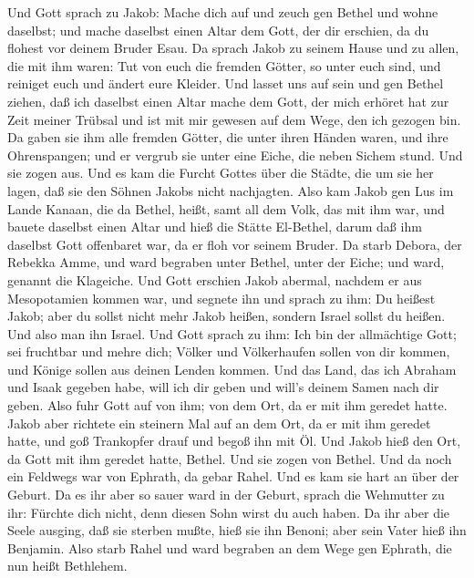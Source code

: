  Und Gott sprach zu Jakob: Mache dich auf und zeuch gen
Bethel und wohne daselbst; und mache daselbst einen Altar dem Gott, der
dir erschien, da du flohest vor deinem Bruder Esau.  Da
sprach Jakob zu seinem Hause und zu allen, die mit ihm waren: Tut von
euch die fremden Götter, so unter euch sind, und reiniget euch und
ändert eure Kleider.  Und lasset uns auf sein und gen Bethel
ziehen, daß ich daselbst einen Altar mache dem Gott, der mich erhöret
hat zur Zeit meiner Trübsal und ist mit mir gewesen auf dem Wege, den
ich gezogen bin.  Da gaben sie ihm alle fremden Götter, die
unter ihren Händen waren, und ihre Ohrenspangen; und er vergrub sie
unter eine Eiche, die neben Sichem stund.  Und sie zogen
aus. Und es kam die Furcht Gottes über die Städte, die um sie her lagen,
daß sie den Söhnen Jakobs nicht nachjagten.  Also kam Jakob
gen Lus im Lande Kanaan, die da Bethel, heißt, samt all dem Volk, das
mit ihm war,  und bauete daselbst einen Altar und hieß die
Stätte El-Bethel, darum daß ihm daselbst Gott offenbaret war, da er floh
vor seinem Bruder.  Da starb Debora, der Rebekka Amme, und
ward begraben unter Bethel, unter der Eiche; und ward, genannt die
Klageiche.  Und Gott erschien Jakob abermal, nachdem er aus
Mesopotamien kommen war, und segnete ihn  und sprach zu
ihm: Du heißest Jakob; aber du sollst nicht mehr Jakob heißen, sondern
Israel sollst du heißen. Und also man ihn Israel.  Und Gott
sprach zu ihm: Ich bin der allmächtige Gott; sei fruchtbar und mehre
dich; Völker und Völkerhaufen sollen von dir kommen, und Könige sollen
aus deinen Lenden kommen.  Und das Land, das ich Abraham
und Isaak gegeben habe, will ich dir geben und will's deinem Samen nach
dir geben.  Also fuhr Gott auf von ihm; von dem Ort, da er
mit ihm geredet hatte.  Jakob aber richtete ein steinern
Mal auf an dem Ort, da er mit ihm geredet hatte, und goß Trankopfer
drauf und begoß ihn mit Öl.  Und Jakob hieß den Ort, da
Gott mit ihm geredet hatte, Bethel.  Und sie zogen von
Bethel. Und da noch ein Feldwegs war von Ephrath, da gebar Rahel.
 Und es kam sie hart an über der Geburt. Da es ihr aber so
sauer ward in der Geburt, sprach die Wehmutter zu ihr: Fürchte dich
nicht, denn diesen Sohn wirst du auch haben.  Da ihr aber
die Seele ausging, daß sie sterben mußte, hieß sie ihn Benoni; aber sein
Vater hieß ihn Benjamin.  Also starb Rahel und ward
begraben an dem Wege gen Ephrath, die nun heißt Bethlehem. 
